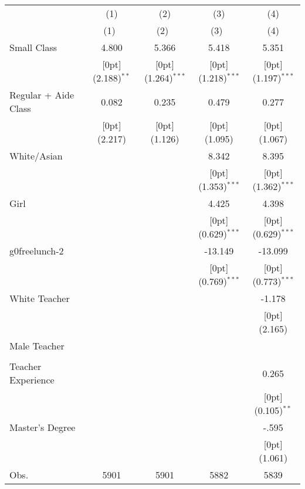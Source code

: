 \begin{tabular*}{\textwidth}{@{\extracolsep{\fill}}lcccc}				
	& \multicolumn{1}{c}{(1)} &	\multicolumn{1}{c}{(2)} &	\multicolumn{1}{c}{(3)} &	\multicolumn{1}{c}{(4)} \\
\cline{2-5}				
	& \multicolumn{1}{c}{(1)\mbox{\ }} &	\multicolumn{1}{c}{(2)\mbox{\ }} &	\multicolumn{1}{c}{(3)\mbox{\ }} &	\multicolumn{1}{c}{(4)} \\
\hline				
Small Class &	4.800 &	5.366 &	5.418 &	5.351 \\
&	\raisebox{.7ex}[0pt]{\scriptsize (2.188)$^{**}$} &	\raisebox{.7ex}[0pt]{\scriptsize (1.264)$^{***}$} &	\raisebox{.7ex}[0pt]{\scriptsize (1.218)$^{***}$} &	\raisebox{.7ex}[0pt]{\scriptsize (1.197)$^{***}$} \\
Regular + Aide Class &	0.082 &	0.235 &	0.479 &	0.277 \\
&	\raisebox{.7ex}[0pt]{\scriptsize (2.217)} &	\raisebox{.7ex}[0pt]{\scriptsize (1.126)} &	\raisebox{.7ex}[0pt]{\scriptsize (1.095)} &	\raisebox{.7ex}[0pt]{\scriptsize (1.067)} \\
White/Asian &	&	&	8.342 &	8.395 \\
&	&	&	\raisebox{.7ex}[0pt]{\scriptsize (1.353)$^{***}$} &	\raisebox{.7ex}[0pt]{\scriptsize (1.362)$^{***}$} \\
Girl &	&	&	4.425 &	4.398 \\
&	&	&	\raisebox{.7ex}[0pt]{\scriptsize (0.629)$^{***}$} &	\raisebox{.7ex}[0pt]{\scriptsize (0.629)$^{***}$} \\
g0freelunch-2 &	&	&	-13.149 &	-13.099 \\
&	&	&	\raisebox{.7ex}[0pt]{\scriptsize (0.769)$^{***}$} &	\raisebox{.7ex}[0pt]{\scriptsize (0.773)$^{***}$} \\
White Teacher &	&	&	&	-1.178 \\
&	&	&	&	\raisebox{.7ex}[0pt]{\scriptsize (2.165)} \\
Male Teacher &	&	&	&	\\
&	&	&	&	\\
Teacher Experience &	&	&	&	0.265 \\
&	&	&	&	\raisebox{.7ex}[0pt]{\scriptsize (0.105)$^{**}$} \\
Master's Degree &	&	&	&	-.595 \\
&	&	&	&	\raisebox{.7ex}[0pt]{\scriptsize (1.061)} \\
Obs. &	5901 &	5901 &	5882 &	5839 \\
\hline\hline				
\end{tabular*}%
